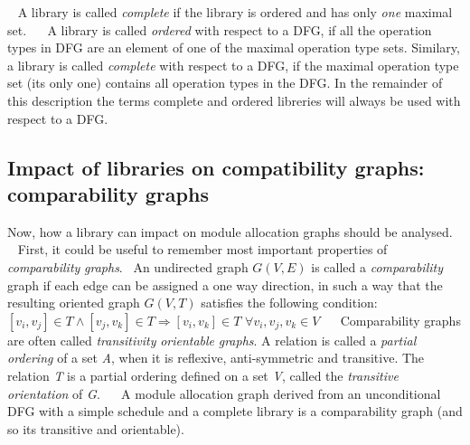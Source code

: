 ~\newline
 A library is called {\itshape complete} if the library is ordered and has only {\itshape one} maximal set.~\newline
~\newline
 A library is called {\itshape ordered} with respect to a D\+FG, if all the operation types in D\+FG are an element of one of the maximal operation type sets. Similary, a library is called {\itshape complete} with respect to a D\+FG, if the maximal operation type set (it\textquotesingle{}s only one) contains all operation types in the D\+FG. In the remainder of this description the terms complete and ordered libreries will always be used with respect to a D\+FG.\hypertarget{src_HLS_module_binding_page_lib_impact}{}\subsection{Impact of libraries on compatibility graphs\+: comparability graphs}\label{src_HLS_module_binding_page_lib_impact}
Now, how a library can impact on module allocation graphs should be analysed.~\newline
~\newline
 First, it could be useful to remember most important properties of {\itshape comparability} {\itshape graphs}.~\newline
 An undirected graph $G(V,E)$ is called a {\itshape comparability} graph if each edge can be assigned a one way direction, in such a way that the resulting oriented graph $G(V,T)$ satisfies the following condition\+:~\newline
~\newline
 $[v_i,v_j]\in T \wedge [v_j,v_k]\in T \Rightarrow [v_i,v_k]\in T$ $\forall v_i,v_j,v_k \in V$~\newline
~\newline
 Comparability graphs are often called {\itshape transitivity} {\itshape orientable} {\itshape graphs}. A relation is called a {\itshape partial} {\itshape ordering} of a set {\itshape A}, when it is reflexive, anti-\/symmetric and transitive. The relation {\itshape T} is a partial ordering defined on a set {\itshape V}, called the {\itshape transitive} {\itshape orientation} of {\itshape G}.~\newline
~\newline
 A module allocation graph derived from an unconditional D\+FG with a simple schedule and a complete library is a comparability graph (and so it\textquotesingle{}s transitive and orientable).~\newline

